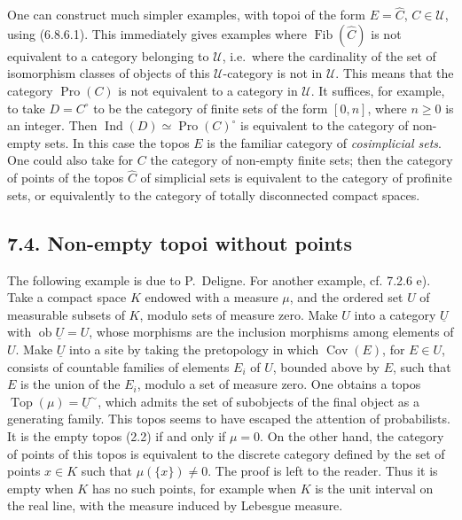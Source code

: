 \documentclass[11pt]{article}
\newcommand{\U}{\mathcal{U}}
\newcommand{\Top}{\operatorname{Top}}
\newcommand{\Cov}{\operatorname{Cov}}
\newcommand{\ob}{\operatorname{ob}}
\newcommand{\Pro}{\operatorname{Pro}}
\newcommand{\Ind}{\operatorname{Ind}}
\newcommand{\Ffib}{\operatorname{Fib}}
\newcommand{\ie}{i.e.}
\begin{document}
One can construct much simpler examples, with topoi of the form \(E=\widehat C\), \(C\in\U\), using (6.8.6.1). This immediately gives examples where \(\Ffib(\widehat C)\) is not equivalent to a category belonging to \(\U\), \ie\ where the cardinality of the set of isomorphism classes of objects of this \(\U\)-category is not in \(\U\). This means that the category \(\Pro(C)\) is not equivalent to a category in \(\U\). It suffices, for example, to take \(D=C^\circ\) to be the category of finite sets of the form \([0,n]\), where \(n\ge0\) is an integer. Then \(\Ind(D)\simeq\Pro(C)^\circ\) is equivalent to the category of non-empty sets. In this case the topos \(E\) is the familiar category of \emph{cosimplicial sets}. One could also take for \(C\) the category of non-empty finite sets; then the category of points of the topos \(\widehat C\) of simplicial sets is equivalent to the category of profinite sets, or equivalently to the category of totally disconnected compact spaces.

\subsection*{7.4. Non-empty topoi without points}

The following example is due to P.~Deligne. For another example, cf. 7.2.6 e). Take a compact space \(K\) endowed with a measure \(\mu\), and the ordered set \(U\) of measurable subsets of \(K\), modulo sets of measure zero. Make \(U\) into a category \(\underline U\) with \(\ob\underline U=U\), whose morphisms are the inclusion morphisms among elements of \(U\). Make \(\underline U\) into a site by taking the pretopology in which \(\Cov(E)\), for \(E\in U\), consists of countable families of elements \(E_i\) of \(U\), bounded above by \(E\), such that \(E\) is the union of the \(E_i\), modulo a set of measure zero. One obtains a topos \(\Top(\mu)=\underline U^{\sim}\), which admits the set of subobjects of the final object as a generating family. This topos seems to have escaped the attention of probabilists. It is the empty topos (2.2) if and only if \(\mu=0\). On the other hand, the category of points of this topos is equivalent to the discrete category defined by the set of points \(x\in K\) such that \(\mu(\{x\})\ne0\). The proof is left to the reader. Thus it is empty when \(K\) has no such points, for example when \(K\) is the unit interval on the real line, with the measure induced by Lebesgue measure.
\end{document}

